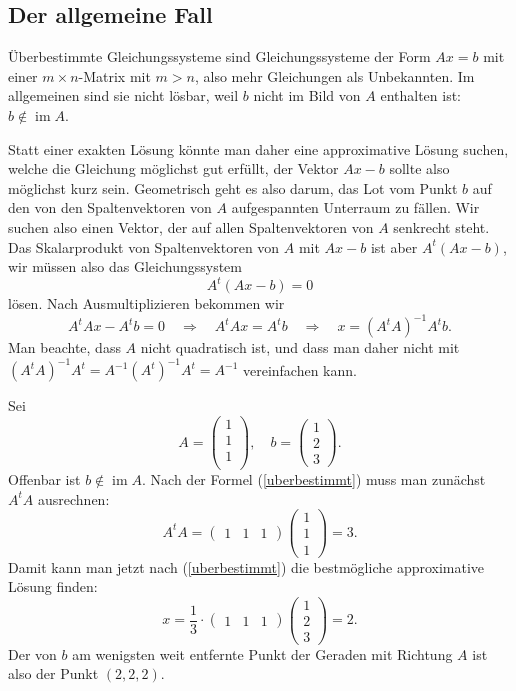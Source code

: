 %
%
\subsection{Der allgemeine Fall}
Überbestimmte Gleichungssysteme sind Gleichungssysteme der Form
$Ax=b$ mit einer $m\times n$-Matrix mit $m>n$, also mehr Gleichungen
als Unbekannten.
Im allgemeinen sind sie nicht lösbar, weil $b$ nicht
im Bild von $A$ enthalten ist: $b\not\in \operatorname{im}A$.

Statt einer exakten Lösung könnte man daher eine approximative
Lösung suchen, welche die Gleichung möglichst gut erfüllt,
der Vektor $Ax-b$ sollte also möglichst kurz sein.
Geometrisch
geht es also darum, das Lot vom Punkt $b$ auf den von den Spaltenvektoren
von $A$ aufgespannten Unterraum zu fällen.
Wir suchen also
einen Vektor, der auf allen Spaltenvektoren von $A$ senkrecht steht.
Das Skalarprodukt von Spaltenvektoren von $A$ mit $Ax-b$ ist aber
$A^t(Ax-b)$, wir müssen also das Gleichungssystem
\[A^t(Ax-b)=0\]
lösen.
Nach Ausmultiplizieren bekommen wir
\begin{equation}
A^tAx-A^tb=0\quad\Rightarrow\quad A^tAx=A^tb\quad\Rightarrow\quad
x=(A^tA)^{-1}A^tb.
\label{uberbestimmt}
\end{equation}
Man beachte, dass $A$ nicht quadratisch ist, und dass man daher
nicht mit $(A^tA)^{-1}A^t=A^{-1}(A^t)^{-1}A^t=A^{-1}$ vereinfachen
kann.

\begin{beispiel}
Sei 
\[
A=\begin{pmatrix}1\\1\\1\\\end{pmatrix},\quad b=\begin{pmatrix}1\\2\\3\end{pmatrix}.
\]
Offenbar ist $b\not\in\operatorname{im}A$.
Nach der Formel (\ref{uberbestimmt}) muss man zunächst $A^tA$ ausrechnen:
\[
A^tA=\begin{pmatrix}1&1&1\end{pmatrix}\begin{pmatrix}1\\1\\1\end{pmatrix}=3.
\]
Damit kann man jetzt nach (\ref{uberbestimmt}) die bestmögliche
approximative Lösung finden:
\[
x=\frac13\cdot\begin{pmatrix}1&1&1\end{pmatrix}
\begin{pmatrix}1\\2\\3\end{pmatrix}=2.
\]
Der von $b$ am wenigsten weit entfernte Punkt der Geraden mit
Richtung $A$ ist also der Punkt $(2,2,2)$.
\end{beispiel}

